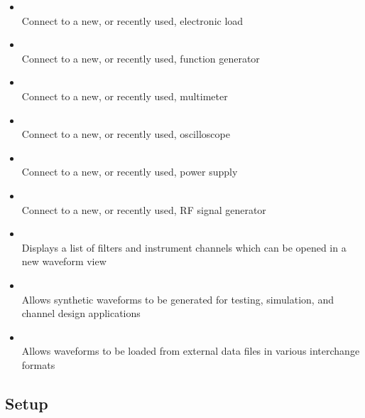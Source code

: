 \begin{itemize}

\item {}\\
Connect to a new, or recently used, electronic load

\item {}\\
Connect to a new, or recently used, function generator

\item {}\\
Connect to a new, or recently used, multimeter

\item {}\\
Connect to a new, or recently used, oscilloscope

\item {}\\
Connect to a new, or recently used, power supply

\item {}\\
Connect to a new, or recently used, RF signal generator

\item {}\\
Displays a list of filters and instrument channels which can be opened in a new waveform view

\item {}\\
Allows synthetic waveforms to be generated for testing, simulation, and channel design applications

\item {}\\
Allows waveforms to be loaded from external data files in various interchange formats

\end{itemize}

\subsection{Setup}

